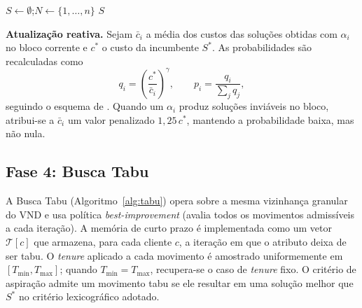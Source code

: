 \documentclass[10pt, a4paper]{article}
\begin{document}
\begin{algorithm}[H]
\caption{Constru\c{c}\~aoRandomizada --- constru\c{c}\~ao com RCL}
\label{alg:construcao}
$S \leftarrow \emptyset$;\quad $N \leftarrow \{1, \ldots, n\}$\;
\Return $S$\;
\end{algorithm}

\textbf{Atualiza\c{c}\~ao reativa.} Sejam $\bar c_i$ a m\'edia dos custos das solu\c{c}\~oes obtidas com $\alpha_i$ no bloco corrente e $c^*$ o custo da incumbente $S^*$. As probabilidades s\~ao recalculadas como
\begin{equation}
q_i = \left(\frac{c^*}{\bar c_i}\right)^{\!\gamma}, \qquad p_i = \frac{q_i}{\sum_{j} q_j},
\label{eq:reactive-prob}
\end{equation}
seguindo o esquema de \citet{prais2000}. Quando um $\alpha_i$ produz solu\c{c}\~oes invi\'aveis no bloco, atribui-se a $\bar c_i$ um valor penalizado $1{,}25\, c^*$, mantendo a probabilidade baixa, mas n\~ao nula.

\subsection{Fase 4: Busca Tabu}
\label{sec-tabu}

A Busca Tabu (Algoritmo~\ref{alg:tabu}) opera sobre a mesma vizinhan\c{c}a granular do VND e usa pol\'itica \emph{best-improvement} (avalia todos os movimentos admiss\'iveis a cada itera\c{c}\~ao). A mem\'oria de curto prazo \'e implementada como um vetor $\mathcal{T}[c]$ que armazena, para cada cliente $c$, a itera\c{c}\~ao em que o atributo deixa de ser tabu. O \textit{tenure} aplicado a cada movimento \'e amostrado uniformemente em $[T_{\min}, T_{\max}]$; quando $T_{\min} = T_{\max}$, recupera-se o caso de \textit{tenure} fixo. O crit\'erio de aspira\c{c}\~ao admite um movimento tabu se ele resultar em uma solu\c{c}\~ao melhor que $S^*$ no crit\'erio lexicogr\'afico adotado.
\end{document}
